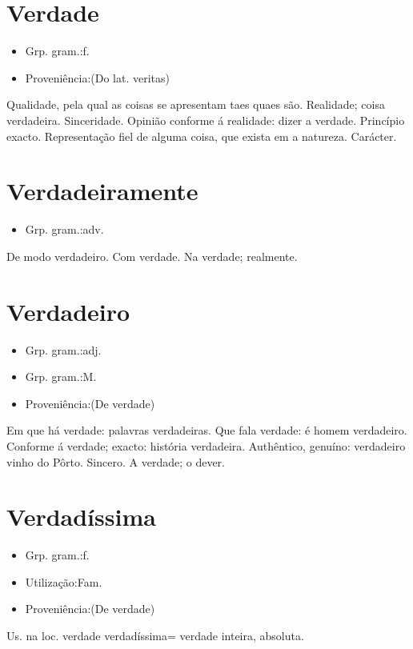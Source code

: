 \documentclass{article}
\begin{document}
\section{Verdade}
\begin{itemize}
\item {Grp. gram.:f.}
\end{itemize}
\begin{itemize}
\item {Proveniência:(Do lat. \textunderscore veritas\textunderscore )}
\end{itemize}
Qualidade, pela qual as coisas se apresentam taes quaes são.
Realidade; coisa verdadeira.
Sinceridade.
Opinião conforme á realidade: \textunderscore dizer a verdade\textunderscore .
Princípio exacto.
Representação fiel de alguma coisa, que exista em a natureza.
Carácter.
\section{Verdadeiramente}
\begin{itemize}
\item {Grp. gram.:adv.}
\end{itemize}
De modo verdadeiro.
Com verdade.
Na verdade; realmente.
\section{Verdadeiro}
\begin{itemize}
\item {Grp. gram.:adj.}
\end{itemize}
\begin{itemize}
\item {Grp. gram.:M.}
\end{itemize}
\begin{itemize}
\item {Proveniência:(De \textunderscore verdade\textunderscore )}
\end{itemize}
Em que há verdade: \textunderscore palavras verdadeiras\textunderscore .
Que fala verdade: \textunderscore é homem verdadeiro\textunderscore .
Conforme á verdade; exacto: \textunderscore história verdadeira\textunderscore .
Authêntico, genuíno: \textunderscore verdadeiro vinho do Pôrto\textunderscore .
Sincero.
A verdade; o dever.
\section{Verdadíssima}
\begin{itemize}
\item {Grp. gram.:f.}
\end{itemize}
\begin{itemize}
\item {Utilização:Fam.}
\end{itemize}
\begin{itemize}
\item {Proveniência:(De \textunderscore verdade\textunderscore )}
\end{itemize}
Us. na loc. \textunderscore verdade verdadíssima\textunderscore  = verdade inteira, absoluta.
\end{document}
